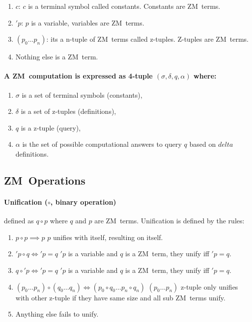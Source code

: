 \documentclass[11pt,a4paper]{report}
\newcommand{\zm}{ZM}
\newcommand{\var}[1]{'#1}
\begin{document}
\begin{enumerate}
\item $c$: $c$ is a terminal symbol called constants. Constants are \zm\ terms.
\item $'p$: $p$ is a variable, variables are \zm\ terms.
\item $(p_{0} \ldots p_{n})$: its a n-tuple of \zm\ terms called z-tuples. Z-tuples are \zm\ terms.
\item Nothing else is a \zm\ term.
\end{enumerate}


\paragraph{A \zm\ computation is expressed as 4-tuple $(\sigma, \delta, q, \alpha)$ where:}

\begin{enumerate}
\item $\sigma$ is a set of terminal symbols (constants),
\item $\delta$ is a set of z-tuples (definitions),
\item $q$ is a z-tuple (query),
\item $\alpha$ is the set of possible computational answers to query $q$ based on $delta$ definitions.
\end{enumerate}


\subsection{\zm\ Operations}

\paragraph{Unification ($\circ$, binary operation)} defined as $q \circ p$ where $q$ and $p$ are \zm\ terms.
Unification is defined by the rules:

\begin{enumerate}
\item $p \circ p \implies p$
    \subitem $p$ unifies with itself, resulting on itself.

\item $\var{p} \circ q \iff \var{p} = q$
    \subitem $\var{p}$ is a variable and $q$ is a \zm\ term, they unify iff $\var{p} = q$.

\item $q \circ \var{p} \iff \var{p} = q$
    \subitem $\var{p}$ is a variable and $q$ is a \zm\ term, they unify iff $\var{p} = q$.

\item $(p_{0} \ldots p_{n}) \circ (q_{0} \ldots q_{n}) \iff (p_{0} \circ q_{0} \ldots p_{n} \circ q_{n})$
    \subitem $(p_{0} \ldots p_{n})$ z-tuple only unifies with other z-tuple if they have same size and all sub \zm\ terms unify.
    
\item Anything else fails to unify.
\end{enumerate}
\end{document}
